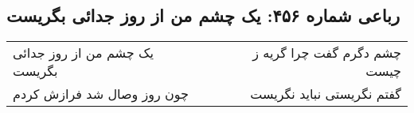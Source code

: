 \begin{center}
\section*{رباعی شماره ۴۵۶: یک چشم من از روز جدائی بگریست}
\label{sec:0456}
\begin{longtable}{l p{0.5cm} r}
یک چشم من از روز جدائی بگریست
&&
چشم دگرم گفت چرا گریه ز چیست
\\
چون روز وصال شد فرازش کردم
&&
گفتم نگریستی نباید نگریست
\\
\end{longtable}
\end{center}
